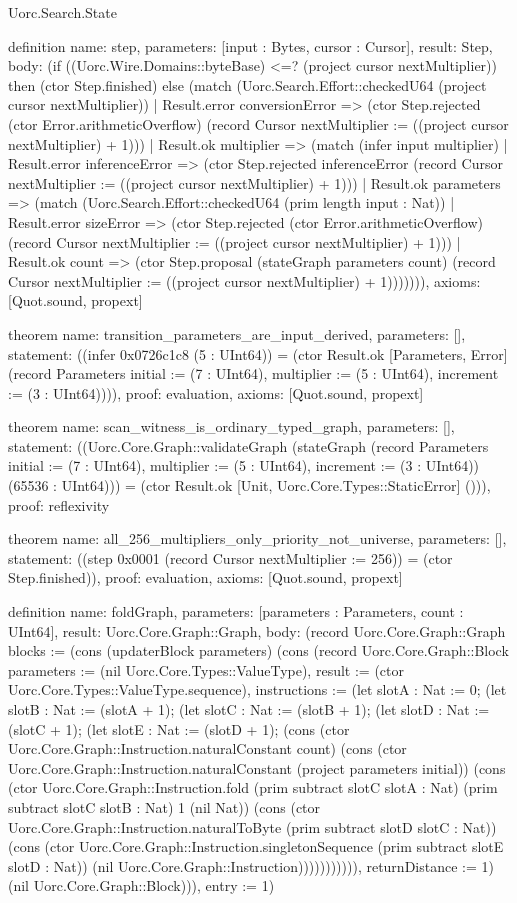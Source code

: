 \begin{lexlean}{Uorc.Search.State}
\begin{semanticmodule}
definition{
  name: step,
  parameters: [input : Bytes, cursor : Cursor],
  result: Step,
  body: (if ((Uorc.Wire.Domains::byteBase) <=? (project cursor nextMultiplier)) then (ctor Step.finished) else (match (Uorc.Search.Effort::checkedU64 (project cursor nextMultiplier))
    | Result.error conversionError => (ctor Step.rejected (ctor Error.arithmeticOverflow) (record Cursor {nextMultiplier := ((project cursor nextMultiplier) + 1)}))
    | Result.ok multiplier => (match (infer input multiplier)
      | Result.error inferenceError => (ctor Step.rejected inferenceError (record Cursor {nextMultiplier := ((project cursor nextMultiplier) + 1)}))
      | Result.ok parameters => (match (Uorc.Search.Effort::checkedU64 (prim length input : Nat))
        | Result.error sizeError => (ctor Step.rejected (ctor Error.arithmeticOverflow) (record Cursor {nextMultiplier := ((project cursor nextMultiplier) + 1)}))
        | Result.ok count => (ctor Step.proposal (stateGraph parameters count) (record Cursor {nextMultiplier := ((project cursor nextMultiplier) + 1)})))))),
  axioms: [Quot.sound, propext]
}

theorem{
  name: transition_parameters_are_input_derived,
  parameters: [],
  statement: ((infer 0x0726c1c8 (5 : UInt64)) = (ctor Result.ok [Parameters, Error] (record Parameters {initial := (7 : UInt64), multiplier := (5 : UInt64), increment := (3 : UInt64)}))),
  proof: evaluation{},
  axioms: [Quot.sound, propext]
}

theorem{
  name: scan_witness_is_ordinary_typed_graph,
  parameters: [],
  statement: ((Uorc.Core.Graph::validateGraph (stateGraph (record Parameters {initial := (7 : UInt64), multiplier := (5 : UInt64), increment := (3 : UInt64)}) (65536 : UInt64))) = (ctor Result.ok [Unit, Uorc.Core.Types::StaticError] ())),
  proof: reflexivity{}
}

theorem{
  name: all_256_multipliers_only_priority_not_universe,
  parameters: [],
  statement: ((step 0x0001 (record Cursor {nextMultiplier := 256})) = (ctor Step.finished)),
  proof: evaluation{},
  axioms: [Quot.sound, propext]
}

definition{
  name: foldGraph,
  parameters: [parameters : Parameters, count : UInt64],
  result: Uorc.Core.Graph::Graph,
  body: (record Uorc.Core.Graph::Graph {blocks := (cons (updaterBlock parameters) (cons (record Uorc.Core.Graph::Block {parameters := (nil Uorc.Core.Types::ValueType), result := (ctor Uorc.Core.Types::ValueType.sequence), instructions := (let slotA : Nat := 0; (let slotB : Nat := (slotA + 1); (let slotC : Nat := (slotB + 1); (let slotD : Nat := (slotC + 1); (let slotE : Nat := (slotD + 1); (cons (ctor Uorc.Core.Graph::Instruction.naturalConstant count) (cons (ctor Uorc.Core.Graph::Instruction.naturalConstant (project parameters initial)) (cons (ctor Uorc.Core.Graph::Instruction.fold (prim subtract slotC slotA : Nat) (prim subtract slotC slotB : Nat) 1 (nil Nat)) (cons (ctor Uorc.Core.Graph::Instruction.naturalToByte (prim subtract slotD slotC : Nat)) (cons (ctor Uorc.Core.Graph::Instruction.singletonSequence (prim subtract slotE slotD : Nat)) (nil Uorc.Core.Graph::Instruction))))))))))), returnDistance := 1}) (nil Uorc.Core.Graph::Block))), entry := 1})
}


\end{semanticmodule}
\end{lexlean}
